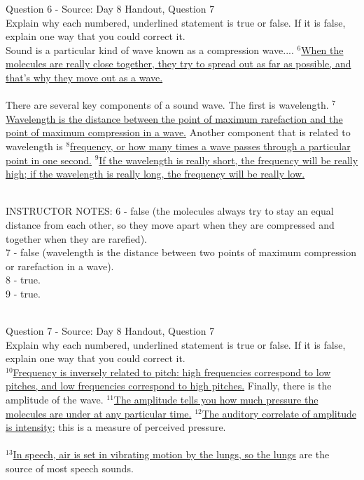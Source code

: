 \documentclass[12pt]{article}
\begin{document}
{\large Question 6} - Source: Day 8 Handout, Question 7\\

Explain why each numbered, underlined statement is true or false. If it is false, explain one way that you could correct it.\\

Sound is a particular kind of wave known as a compression wave.... $^6$\ul{When the molecules are really close together, they try to spread out as far as possible, and that’s why they move out as a wave.}\\\\There are several key components of a sound wave. The first is wavelength. $^7$\ul{Wavelength is the distance between the point of maximum rarefaction and the point of maximum compression in a wave.} Another component that is related to wavelength is $^8$\ul{frequency, or how many times a wave passes through a particular point in one second.} $^9$\ul{If the wavelength is really short, the frequency will be really high; if the wavelength is really long, the frequency will be really low.} 


~\\
INSTRUCTOR NOTES: 6 - false (the molecules always try to stay an equal distance from each other, so they move apart when they are compressed and together when they are rarefied).\\7 - false (wavelength is the distance between two points of maximum compression or rarefaction in a wave).\\8 - true.\\9 - true.


~\\

{\large Question 7} - Source: Day 8 Handout, Question 7\\

Explain why each numbered, underlined statement is true or false. If it is false, explain one way that you could correct it.\\

$^{10}$\ul{Frequency is inversely related to pitch: high frequencies correspond to low pitches, and low frequencies correspond to high pitches.} Finally, there is the amplitude of the wave. $^{11}$\ul{The amplitude tells you how much pressure the molecules are under at any particular time.} $^{12}$\ul{The auditory correlate of amplitude is intensity}; this is a measure of perceived pressure.\\\\$^{13}$\ul{In speech, air is set in vibrating motion by the lungs, so the lungs} are the source of most speech sounds.
\end{document}
